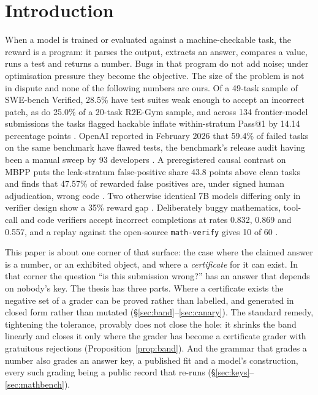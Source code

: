 \documentclass[11pt]{article}
\theoremstyle{definition}
\begin{document}
\section{Introduction}

When a model is trained or evaluated against a machine-checkable task, the reward is a program: it parses the output, extracts an answer, compares a value, runs a test and returns a number. Bugs in that program do not add noise; under optimisation pressure they become the objective. The size of the problem is not in dispute and none of the following numbers are ours. Of a 49-task sample of SWE-bench Verified, 28.5\% have test suites weak enough to accept an incorrect patch, as do 25.0\% of a 20-task R2E-Gym sample, and across 134 frontier-model submissions the tasks flagged hackable inflate within-stratum Pass@1 by 14.14 percentage points \cite{Rajan26}. OpenAI reported in February 2026 that 59.4\% of failed tasks on the same benchmark have flawed tests, the benchmark's release audit having been a manual sweep by 93 developers \cite{OpenAI26}. A preregistered causal contrast on MBPP puts the leak-stratum false-positive share 43.8 points above clean tasks and finds that 47.57\% of rewarded false positives are, under signed human adjudication, wrong code \cite{Zhang26}. Two otherwise identical 7B models differing only in verifier design show a 35\% reward gap \cite{Gaming26}. Deliberately buggy mathematics, tool-call and code verifiers accept incorrect completions at rates 0.832, 0.869 and 0.557, and a replay against the open-source \texttt{math-verify} gives 10 of 60 \cite{Ray26}.

This paper is about one corner of that surface: the case where the claimed answer is a number, or an exhibited object, and where a \emph{certificate} for it can exist. In that corner the question ``is this submission wrong?'' has an answer that depends on nobody's key. The thesis has three parts. Where a certificate exists the negative set of a grader can be proved rather than labelled, and generated in closed form rather than mutated (\S\ref{sec:band}--\ref{sec:canary}). The standard remedy, tightening the tolerance, provably does not close the hole: it shrinks the band linearly and closes it only where the grader has become a certificate grader with gratuitous rejections (Proposition~\ref{prop:band}). And the grammar that grades a number also grades an answer key, a published fit and a model's construction, every such grading being a public record that re-runs (\S\ref{sec:keys}--\ref{sec:mathbench}).
\end{document}
